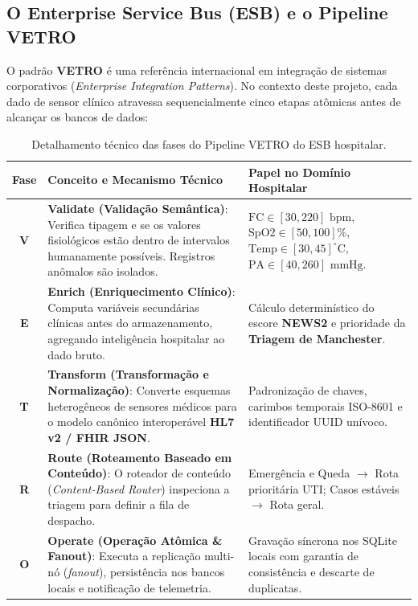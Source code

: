 \documentclass[11pt,a4paper]{article}
\begin{document}
\subsection{O Enterprise Service Bus (ESB) e o Pipeline VETRO}

O padrão \textbf{VETRO} é uma referência internacional em integração de sistemas corporativos (\textit{Enterprise Integration Patterns}). No contexto deste projeto, cada dado de sensor clínico atravessa sequencialmente cinco etapas atômicas antes de alcançar os bancos de dados:

\begin{table}[H]
\centering
\small
\begin{tabularx}{\linewidth}{c X p{5.2cm}}
\toprule
\textbf{Fase} & \textbf{Conceito e Mecanismo Técnico} & \textbf{Papel no Domínio Hospitalar} \\
\midrule
\textbf{V} & \textbf{Validate (Validação Semântica)}: \newline
Verifica tipagem e se os valores fisiológicos estão dentro de intervalos humanamente possíveis. Registros anômalos são isolados. & 
$\text{FC} \in [30, 220]\text{ bpm}$, $\text{SpO2} \in [50, 100]\%$, \newline
$\text{Temp} \in [30, 45]^\circ\text{C}$, $\text{PA} \in [40, 260]\text{ mmHg}$. \\
\addlinespace
\textbf{E} & \textbf{Enrich (Enriquecimento Clínico)}: \newline
Computa variáveis secundárias clínicas antes do armazenamento, agregando inteligência hospitalar ao dado bruto. & 
Cálculo determinístico do escore \textbf{NEWS2} e prioridade da \textbf{Triagem de Manchester}. \\
\addlinespace
\textbf{T} & \textbf{Transform (Transformação e Normalização)}: \newline
Converte esquemas heterogêneos de sensores médicos para o modelo canônico interoperável \textbf{HL7 v2 / FHIR JSON}. & 
Padronização de chaves, carimbos temporais ISO-8601 e identificador UUID unívoco. \\
\addlinespace
\textbf{R} & \textbf{Route (Roteamento Baseado em Conteúdo)}: \newline
O roteador de conteúdo (\textit{Content-Based Router}) inspeciona a triagem para definir a fila de despacho. & 
Emergência e Queda $\to$ Rota prioritária UTI; Casos estáveis $\to$ Rota geral. \\
\addlinespace
\textbf{O} & \textbf{Operate (Operação Atômica \& Fanout)}: \newline
Executa a replicação multi-nó (\textit{fanout}), persistência nos bancos locais e notificação de telemetria. & 
Gravação síncrona nos SQLite locais com garantia de consistência e descarte de duplicatas. \\
\bottomrule
\end{tabularx}
\caption{Detalhamento técnico das fases do Pipeline VETRO do ESB hospitalar.}
\end{table}
\end{document}
